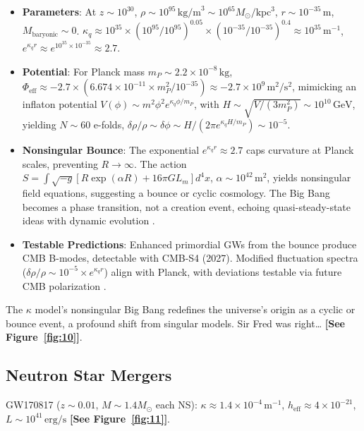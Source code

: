 \documentclass[a4paper,12pt]{article}
\begin{document}
\begin{itemize}
    \item \textbf{Parameters}: At $z \sim 10^{30}$, $\rho \sim 10^{95} \, \text{kg/m}^3 \sim 10^{65} M_\odot/\text{kpc}^3$, $r \sim 10^{-35} \, \text{m}$, $M_\text{baryonic} \sim 0$. $\kappa_q \approx 10^{35} \times (10^{95} / 10^{95})^{0.05} \times (10^{-35}/10^{-35})^{0.4} \approx 10^{35} \, \text{m}^{-1}$, $e^{\kappa_q r} \approx e^{10^{35} \times 10^{-35}} \approx 2.7$.
    \item \textbf{Potential}: For Planck mass $m_P \sim 2.2 \times 10^{-8} \, \text{kg}$, $\Phi_\text{eff} \approx -2.7 \times (6.674 \times 10^{-11} \times m_P^2 / 10^{-35}) \approx -2.7 \times 10^9 \, \text{m}^2/\text{s}^2$, mimicking an inflaton potential $V(\phi) \sim m^2 \phi^2 e^{\kappa_q \phi/m_P}$, with $H \sim \sqrt{V / (3 m_P^2)} \sim 10^{10} \, \text{GeV}$, yielding $N \sim 60$ e-folds, $\delta\rho/\rho \sim \delta\phi \sim H/(2\pi e^{\kappa_q H/m_P}) \sim 10^{-5}$.
    \item \textbf{Nonsingular Bounce}: The exponential $e^{\kappa_q r} \approx 2.7$ caps curvature at Planck scales, preventing $R \to \infty$. The action $S = \int \sqrt{-g} [ R \exp(\alpha R) + 16\pi G L_m ] d^4x$, $\alpha \sim 10^{42} \, \text{m}^2$, yields nonsingular field equations, suggesting a bounce or cyclic cosmology. The Big Bang becomes a phase transition, not a creation event, echoing quasi-steady-state ideas with dynamic evolution \citep{Nojiri2007,Odintsov2011}.
    \item \textbf{Testable Predictions}: Enhanced primordial GWs from the bounce produce CMB B-modes, detectable with CMB-S4 (2027). Modified fluctuation spectra ($\delta\rho/\rho \sim 10^{-5} \times e^{\kappa_q r}$) align with Planck, with deviations testable via future CMB polarization \citep{Planck2020}.
\end{itemize}
The $\kappa$ model’s nonsingular Big Bang redefines the universe’s origin as a cyclic or bounce event, a profound shift from singular models. Sir Fred was right… \citep{Hoyle1993} \textbf{[See Figure~\ref{fig:10}]}.

\subsection{Neutron Star Mergers}
GW170817 ($z \sim 0.01$, $M \sim 1.4 M_\odot$ each NS): $\kappa \approx 1.4 \times 10^{-4} \, \text{m}^{-1}$, $h_\text{eff} \approx 4 \times 10^{-21}$, $L \sim 10^{41} \, \text{erg/s}$ \citep{Metzger2017} \textbf{[See Figure~\ref{fig:11}]}.
\end{document}
